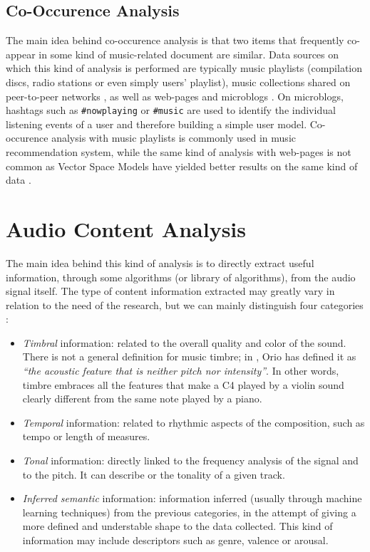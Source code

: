 \subsection{Co-Occurence Analysis}
The main idea behind co-occurence analysis is that two items that frequently co-appear in some kind of music-related document are similar. Data sources on which this kind of analysis is performed are typically music playlists \cite{pachet01} (compilation discs, radio stations or even simply users' playlist), music collections shared on peer-to-peer networks \cite{whitman02}, as well as web-pages \cite{zadel04} \cite{cohen00} and microblogs \cite{schedlmicro} \cite{zangerle12}. On microblogs, hashtags such as \texttt{#nowplaying} or \texttt{#music} are used to identify the individual listening events of a user and therefore building a simple user model. Co-occurence analysis with music playlists is commonly used in music recommendation system, while the same kind of analysis with web-pages is not common as Vector Space Models have yielded better results on the same kind of data \cite{schedlpohle}.

\section{Audio Content Analysis}
The main idea behind this kind of analysis is to directly extract useful information, through some algorithms (or library of algorithms), from the audio signal itself. The type of content information extracted may greatly vary in relation to the need of the research, but we can mainly distinguish four categories \cite{bogdanov13}:
\begin{itemize}
\item \textit{Timbral} information: related to the overall quality and color of the sound. There is not a general definition for music timbre; in \cite{orio06}, Orio has defined it as \textit{``the acoustic feature that is neither pitch nor intensity''}. In other words, timbre embraces all the features that make a C4 played by a violin sound clearly different from the same note played by a piano.
\item \textit{Temporal} information: related to rhythmic aspects of the composition, such as tempo or length of measures.
\item \textit{Tonal} information: directly linked to the frequency analysis of the signal and to the pitch. It can describe  or the tonality of a given track.
\item \textit{Inferred semantic} information: information inferred (usually through machine learning techniques) from the previous categories, in the attempt of giving a more defined and understable shape to the data collected. This kind of information may include descriptors such as genre, valence or arousal.
\end{itemize}

